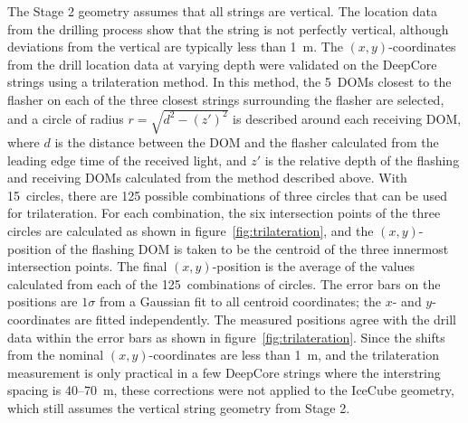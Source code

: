 The Stage 2 geometry assumes that all strings are vertical. The
location data from the drilling process show that the string is not perfectly vertical,
although deviations from the vertical are typically less than 1~m. The
$(x,y)$-coordinates from the drill location data at varying depth were validated on the DeepCore strings
using a trilateration method. In this method, the 5~DOMs closest to the
flasher on each of the three closest strings surrounding the flasher are
selected, and a circle of radius $r = \sqrt{d^2 - (z')^2}$ is
described around each receiving DOM, where $d$ is the distance between the DOM
and the flasher calculated from the leading edge time of the received
light, and $z'$ is the relative depth of the flashing and receiving
DOMs calculated from the method described above. With 15~circles,
there are 125 possible combinations of three circles that can be used
for trilateration. For each combination, the six intersection points
of the three circles are calculated as shown in
figure~\ref{fig:trilateration}, and the $(x,y)$-position of the flashing DOM 
is taken to be the centroid of the three innermost intersection
points. The final $(x,y)$-position is the average of the values
calculated from each of the 125~combinations of circles. The
error bars on the positions are $1 \sigma$ from a Gaussian fit to all centroid
coordinates; the $x$- and $y$-coordinates are fitted independently. The
measured positions agree with the drill data within the error bars as shown in
figure~\ref{fig:trilateration}. Since the shifts from the nominal
$(x,y)$-coordinates are less than 1~m, and the trilateration measurement is only
practical in a few DeepCore strings where the interstring spacing is 40--70~m, these
corrections were not applied to the IceCube geometry, which still assumes
the vertical string geometry from Stage 2.



